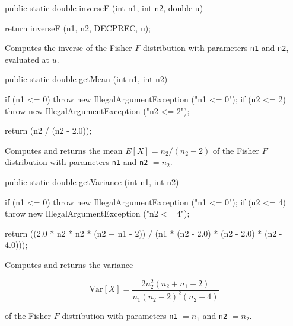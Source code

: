 \begin{code}

   public static double inverseF (int n1, int n2, double u)\begin{hide} {
       return inverseF (n1, n2, DECPREC, u);      
   }\end{hide}
\end{code}
\begin{tabb}
Computes the inverse of the Fisher $F$ distribution with parameters \texttt{n1}
 and \texttt{n2}, evaluated at $u$.
\end{tabb}
\begin{code}

   public static double getMean (int n1, int n2)\begin{hide} {
      if (n1 <= 0)
         throw new IllegalArgumentException ("n1 <= 0");
      if (n2 <= 2)
         throw new IllegalArgumentException ("n2 <= 2");

      return (n2 / (n2 - 2.0));
   }\end{hide}
\end{code}
\begin{tabb}  Computes and returns the mean $E[X] = n_2 / (n_2 - 2)$ of the
Fisher $F$ distribution with parameters \texttt{n1} and \texttt{n2} $=n_2$.
\end{tabb}
\begin{htmlonly}
\end{htmlonly}
\begin{code}

   public static double getVariance (int n1, int n2)\begin{hide} {
      if (n1 <= 0)
         throw new IllegalArgumentException ("n1 <= 0");
      if (n2 <= 4)
         throw new IllegalArgumentException ("n2 <= 4");

      return ((2.0 * n2 * n2 * (n2 + n1 - 2)) / (n1 * (n2 - 2.0) * (n2 - 2.0) * (n2 - 4.0)));
   }\end{hide}
\end{code}
\begin{tabb}  Computes and returns the variance
\begin{latexonly}
$$\mbox{Var}[X] = \frac{2n_2^{2} (n_2 + n_1 - 2)}{n_1 (n_2 - 2)^{2} (n_2 - 4)}$$
\end{latexonly}
of the Fisher $F$ distribution with parameters \texttt{n1} $=n_1$
 and \texttt{n2} $=n_2$.
\end{tabb}
\begin{htmlonly}
   \return{the variance of the Fisher $F$ distribution
   $\mbox{Var}[X] = (2n2^2 (n2 + n1 - 2)) / (n1 (n2 - 2)^2 (n2 - 4))$
\end{htmlonly}
